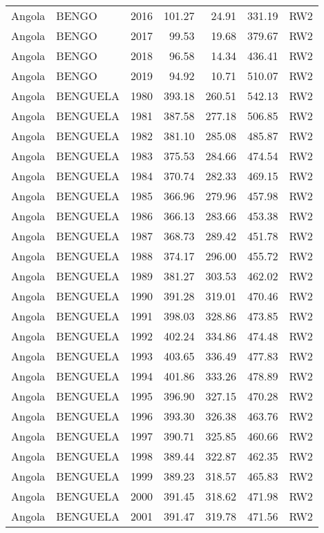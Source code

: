 \begin{longtable}{lllrrrl}
  Angola & BENGO & 2016 & 101.27 & 24.91 & 331.19 & RW2 \\ 
  Angola & BENGO & 2017 & 99.53 & 19.68 & 379.67 & RW2 \\ 
  Angola & BENGO & 2018 & 96.58 & 14.34 & 436.41 & RW2 \\ 
  Angola & BENGO & 2019 & 94.92 & 10.71 & 510.07 & RW2 \\ 
  Angola & BENGUELA & 1980 & 393.18 & 260.51 & 542.13 & RW2 \\ 
  Angola & BENGUELA & 1981 & 387.58 & 277.18 & 506.85 & RW2 \\ 
  Angola & BENGUELA & 1982 & 381.10 & 285.08 & 485.87 & RW2 \\ 
  Angola & BENGUELA & 1983 & 375.53 & 284.66 & 474.54 & RW2 \\ 
  Angola & BENGUELA & 1984 & 370.74 & 282.33 & 469.15 & RW2 \\ 
  Angola & BENGUELA & 1985 & 366.96 & 279.96 & 457.98 & RW2 \\ 
  Angola & BENGUELA & 1986 & 366.13 & 283.66 & 453.38 & RW2 \\ 
  Angola & BENGUELA & 1987 & 368.73 & 289.42 & 451.78 & RW2 \\ 
  Angola & BENGUELA & 1988 & 374.17 & 296.00 & 455.72 & RW2 \\ 
  Angola & BENGUELA & 1989 & 381.27 & 303.53 & 462.02 & RW2 \\ 
  Angola & BENGUELA & 1990 & 391.28 & 319.01 & 470.46 & RW2 \\ 
  Angola & BENGUELA & 1991 & 398.03 & 328.86 & 473.85 & RW2 \\ 
  Angola & BENGUELA & 1992 & 402.24 & 334.86 & 474.48 & RW2 \\ 
  Angola & BENGUELA & 1993 & 403.65 & 336.49 & 477.83 & RW2 \\ 
  Angola & BENGUELA & 1994 & 401.86 & 333.26 & 478.89 & RW2 \\ 
  Angola & BENGUELA & 1995 & 396.90 & 327.15 & 470.28 & RW2 \\ 
  Angola & BENGUELA & 1996 & 393.30 & 326.38 & 463.76 & RW2 \\ 
  Angola & BENGUELA & 1997 & 390.71 & 325.85 & 460.66 & RW2 \\ 
  Angola & BENGUELA & 1998 & 389.44 & 322.87 & 462.35 & RW2 \\ 
  Angola & BENGUELA & 1999 & 389.23 & 318.57 & 465.83 & RW2 \\ 
  Angola & BENGUELA & 2000 & 391.45 & 318.62 & 471.98 & RW2 \\ 
  Angola & BENGUELA & 2001 & 391.47 & 319.78 & 471.56 & RW2 \\ 

\end{longtable}
